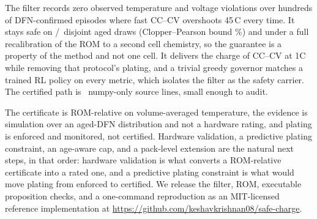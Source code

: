 \documentclass[conference]{IEEEtran}
\newcommand{\SI}[2]{#1\,#2}
\newcommand{\degreeCelsius}{\textdegree C}
\begin{document}
The filter records zero observed temperature and voltage violations over
hundreds of DFN-confirmed episodes where fast CC--CV overshoots \SI{45}{\degreeCelsius} every time.
It stays safe on \valSafe/\valN\ disjoint aged draws (Clopper--Pearson bound \valCP\%) and under a full
recalibration of the ROM to a second cell chemistry, so the guarantee is a property of the method and
not one cell. It delivers the charge of CC--CV at 1C while removing that protocol's plating, and a
trivial greedy governor matches a trained RL policy on every metric, which isolates the filter as the
safety carrier. The certified path is \filterSloc\ numpy-only source lines, small enough to audit.

The certificate is ROM-relative on volume-averaged temperature, the
evidence is simulation over an aged-DFN distribution and not a hardware rating, and plating is enforced
and monitored, not certified. Hardware validation, a predictive plating constraint, an age-aware cap,
and a pack-level extension are the natural next steps, in that order: hardware validation is what
converts a ROM-relative certificate into a rated one, and a predictive plating constraint is what would
move plating from enforced to certified. We release the filter, ROM, executable
proposition checks, and a one-command reproduction as an MIT-licensed reference implementation at
\url{https://github.com/keshavkrishnan08/safe-charge}.



\end{document}
